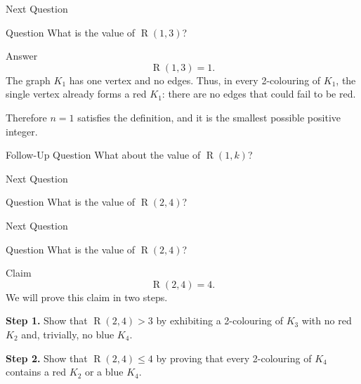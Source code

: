 \documentclass[aspectratio=169,11pt]{beamer}
\newcommand{\Ram}{\operatorname{R}}
\begin{document}
\begin{frame}[t]{Next Question}
\vspace{0.10cm}

\begin{block}{Question}
\large
What is the value of $\Ram(1,3)$?
\end{block}

\vspace{0.35cm}

\begin{alertblock}{Answer}
\large
\[
  \boxed{\Ram(1,3)=1}.
\]
The graph $K_1$ has one vertex and no edges. Thus, in every 2-colouring
of $K_1$, the single vertex already forms a red $K_1$: there are no edges
that could fail to be red.

\vspace{0.25cm}

Therefore $n=1$ satisfies the definition, and it is the smallest possible
positive integer.
\end{alertblock}

\vfill

\begin{block}{Follow-Up Question}
\large
What about the value of $\Ram(1,k)$?
\end{block}
\end{frame}

\begin{frame}[t]{Next Question}
\vspace{0.10cm}

\begin{block}{Question}
\large
What is the value of $\Ram(2,4)$?
\end{block}
\end{frame}

\begin{frame}[t]{Next Question}
\vspace{0.10cm}

\begin{block}{Question}
\large
What is the value of $\Ram(2,4)$?
\end{block}

\vspace{0.30cm}

\begin{alertblock}{Claim}
\large
\[
  \boxed{\Ram(2,4)=4}.
\]
We will prove this claim in two steps.

\vspace{0.18cm}

\textbf{Step 1.}
Show that $\Ram(2,4)>3$ by exhibiting a 2-colouring of $K_3$
with no red $K_2$ and, trivially, no blue $K_4$.

\vspace{0.18cm}

\textbf{Step 2.}
Show that $\Ram(2,4)\le 4$ by proving that every 2-colouring of
$K_4$ contains a red $K_2$ or a blue $K_4$.
\end{alertblock}
\end{frame}
\end{document}
